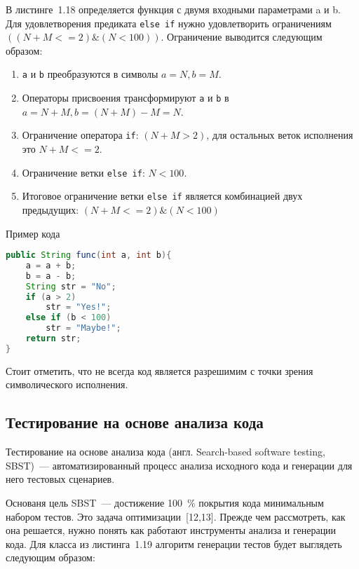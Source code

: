 В листинге~1.18 определяется функция с двумя входными параметрами a и b. Для удовлетворения предиката \texttt{else if} нужно удовлетворить ограничениям \(((N + M <= 2)\&(N < 100))\). Ограничение выводится следующим образом:

\begin{enumerate}
	\item \texttt{a} и \texttt{b} преобразуются в символы  \(a = N, b = M\).
	\item Операторы присвоения трансформируют \texttt{a} и \texttt{b} в  \(a = N + M, b = (N + M) - M = N\).
	\item Ограничение оператора \texttt{if}: \((N + M > 2)\), для остальных веток исполнения это \(N + M <= 2\).
	\item Ограничение ветки \texttt{else if}: \(N < 100\).
	\item Итоговое ограничение ветки \texttt{else if} является комбинацией  двух предыдущих:  \( (N + M <= 2) \& (N < 100)\)
\end{enumerate}

\begin{ListingEnv}[!h]%
	\captiondelim{ } %
	\caption{Пример кода}
	\begin{lstlisting}[language={Java}]
public String func(int a, int b){
	a = a + b;
	b = a - b;
	String str = "No";
	if (a > 2)
		str = "Yes!";
	else if (b < 100)
		str = "Maybe!";
	return str;
}
	\end{lstlisting}
\end{ListingEnv}%

Стоит отметить, что не всегда код является разрешимим с точки зрения символического исполнения.


\subsection{Тестирование на основе анализа кода} 
 
 Тестирование на основе анализа кода (англ. Search-based software testing,  SBST)~--- автоматизированный процесс анализа исходного кода и генерации для него тестовых сценариев. 
 
 Основаня цель SBST~--- достижение 100~\% покрытия кода минимальным набором тестов. Это задача оптимизации~[12,13]. Прежде чем рассмотреть, как она решается, нужно понять как работают инструменты  анализа и генерации кода. Для класса из листинга~1.19 алгоритм генерации тестов будет выглядеть следующим образом: 
 
